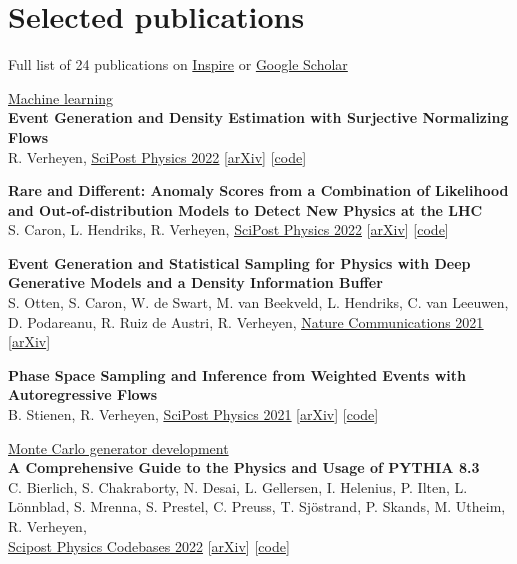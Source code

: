 \documentclass[a4paper,12pt]{article}
\begin{document}
\section{Selected publications}
Full list of 24 publications on \href{https://inspirehep.net/authors/1777870?ui-citation-summary=true}{Inspire} or \href{https://scholar.google.com/citations?user=MRTAm7UAAAAJ&hl=en&oi=ao}{Google Scholar}

\underline{\large{Machine learning}} \\ [5pt]
\textbf{Event Generation and Density Estimation with Surjective Normalizing Flows} \\
R. Verheyen, 
\href{https://scipost.org/10.21468/SciPostPhys.13.3.047}{\underline{SciPost Physics 2022}} [\href{https://arxiv.org/abs/2205.01697}{arXiv}] [\href{https://github.com/rbvh/surflows}{code}]

\textbf{Rare and Different: Anomaly Scores from a Combination of Likelihood and Out-of-distribution Models to Detect New Physics at the LHC} \\
S. Caron, L. Hendriks, R. Verheyen,
\href{https://scipost.org/10.21468/SciPostPhys.12.1.043}{\underline{SciPost Physics 2022}} [\href{https://arxiv.org/pdf/2105.14027.pdf}{arXiv}] [\href{https://github.com/bostdiek/DarkMachines-UnsupervisedChallenge}{code}]

\textbf{Event Generation and Statistical Sampling for Physics with Deep Generative Models and a Density Information Buffer} \\
S. Otten, S. Caron, W. de Swart, M. van Beekveld, L. Hendriks, C. van Leeuwen, D. Podareanu, R. Ruiz de Austri, R. Verheyen, 
\href{https://www.nature.com/articles/s41467-021-22616-z}{\underline{Nature Communications 2021}} [\href{https://arxiv.org/abs/1901.00875}{arXiv}]

\textbf{Phase Space Sampling and Inference from Weighted Events with Autoregressive Flows} \\
B. Stienen, R. Verheyen, 
\href{https://scipost.org/10.21468/SciPostPhys.10.2.038}{\underline{SciPost Physics 2021}} [\href{https://arxiv.org/pdf/2011.13445.pdf}{arXiv}] [\href{https://github.com/rbvh/PhaseSpaceAutoregressiveFlow}{code}]



\underline{\large{Monte Carlo generator development}} \\[5pt]
\textbf{A Comprehensive Guide to the Physics and Usage of PYTHIA 8.3} \\
C. Bierlich, S. Chakraborty, N. Desai, L. Gellersen, I. Helenius, P. Ilten, L. Lönnblad, S. Mrenna, S. Prestel, C. Preuss, T. Sjöstrand, P. Skands, M. Utheim, R. Verheyen, \\
\href{https://arxiv.org/abs/2203.11601}{\underline{Scipost Physics Codebases 2022}} [\href{https://arxiv.org/abs/2203.11601}{arXiv}] [\href{https://pythia.org}{code}]
\end{document}

